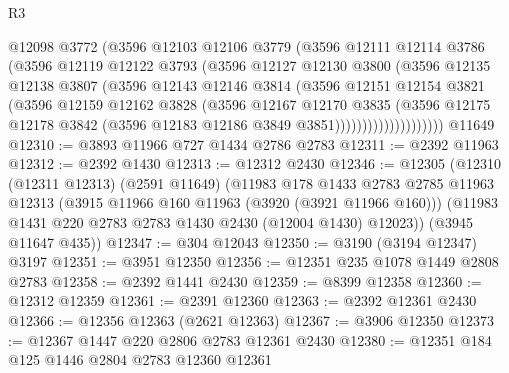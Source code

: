 \begin{lexlean}{R3}
\begin{coremodule}
                      @12098
                      @3772
                      (@3596
                        @12103
                        @12106
                        @3779
                        (@3596
                          @12111
                          @12114
                          @3786
                          (@3596
                            @12119
                            @12122
                            @3793
                            (@3596
                              @12127
                              @12130
                              @3800
                              (@3596
                                @12135
                                @12138
                                @3807
                                (@3596
                                  @12143
                                  @12146
                                  @3814
                                  (@3596
                                    @12151
                                    @12154
                                    @3821
                                    (@3596
                                      @12159
                                      @12162
                                      @3828
                                      (@3596
                                        @12167
                                        @12170
                                        @3835
                                        (@3596
                                          @12175
                                          @12178
                                          @3842
                                          (@3596 @12183 @12186 @3849 @3851))))))))))))))))))))
    @11649
@12310 := @3893 @11966 @727 @1434 @2786 @2783
@12311 := @2392 @11963
@12312 := @2392 @1430
@12313 := @12312 @2430
@12346 := @12305
    (@12310
      (@12311 @12313)
      (@2591 @11649)
      (@11983
        @178
        @1433
        @2783
        @2785
        @11963
        @12313
        (@3915 @11966 @160 @11963 (@3920 (@3921 @11966 @160)))
        (@11983 @1431 @220 @2783 @2783 @1430 @2430 (@12004 @1430) @12023))
      (@3945 @11647 @435))
@12347 := @304 @12043
@12350 := @3190 (@3194 @12347) @3197
@12351 := @3951 @12350
@12356 := @12351 @235 @1078 @1449 @2808 @2783
@12358 := @2392 @1441 @2430
@12359 := @8399 @12358
@12360 := @12312 @12359
@12361 := @2391 @12360
@12363 := @2392 @12361 @2430
@12366 := @12356 @12363 (@2621 @12363)
@12367 := @3906 @12350
@12373 := @12367 @1447 @220 @2806 @2783 @12361 @2430
@12380 := @12351 @184 @125 @1446 @2804 @2783 @12360 @12361

\end{coremodule}
\end{lexlean}
